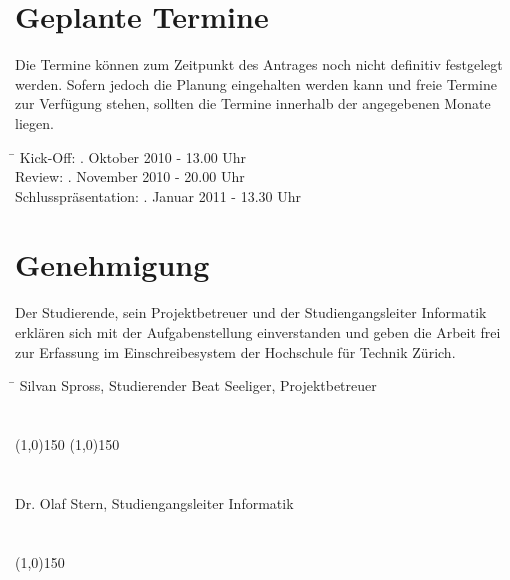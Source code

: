 \documentclass[]{scrreprt}
\begin{document}
    \section{Geplante Termine}
    Die Termine können zum Zeitpunkt des Antrages noch nicht definitiv 
    festgelegt werden. Sofern jedoch die Planung eingehalten werden kann und 
    freie Termine zur Verfügung stehen, sollten die Termine innerhalb der 
    angegebenen Monate liegen.

    \begin{tabbing}
        \hspace*{4cm}\= \kill
    	Kick-Off:               . Oktober 2010 - 13.00 Uhr \\
    	Review:                 . November 2010 - 20.00 Uhr \\
    	Schlusspräsentation:    . Januar 2011 - 13.30 Uhr \\
    \end{tabbing}

    \section{Genehmigung}
    Der Studierende, sein Projektbetreuer und der Studiengangsleiter 
    Informatik erklären sich mit der Aufgabenstellung einverstanden und geben 
    die Arbeit frei zur Erfassung im Einschreibesystem der Hochschule für 
    Technik Zürich.

    \begin{tabbing}
        \hspace*{10cm}\= \kill
    	Silvan Spross, Studierender \> Beat Seeliger, Projektbetreuer \\\\\\
        \line(1,0){150} \> \line(1,0){150} \\\\\\
    	Dr. Olaf Stern, Studiengangsleiter Informatik \\\\\\
        \line(1,0){150}
    \end{tabbing}
    
    
    
    
\end{document}

